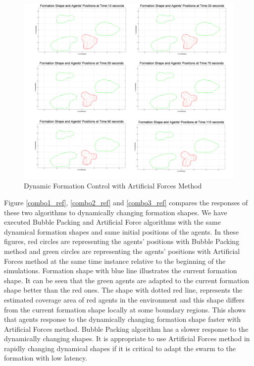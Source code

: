 \begin{figure}[H]
\caption{Dynamic Formation Control with Artificial Forces Method} \label{multiple2_ref}
\centerline{\includegraphics[scale = 0.16]{multiple2}}
\end{figure} 

Figure \ref{combo1_ref}, \ref{combo2_ref} and \ref{combo3_ref} compares the responses of these two algorithms to dynamically changing formation shapes. We have executed Bubble Packing and Artificial Force algorithms with the same dynamical formation shapes and same initial positions of the agents. In these figures, red circles are representing the agents' positions with Bubble Packing method and green circles are representing the agents' positions with Artificial Forces method at the same time instance relative to the beginning of the simulations. Formation shape with blue line illustrates the current formation shape. It can be seen that the green agents are adapted to the current formation shape better than the red ones. The shape with dotted red line, represents the estimated coverage area of red agents in the environment and this shape differs from the current formation shape locally at some boundary regions. This shows that agents response to the dynamically changing formation shape faster with Artificial Forces method. Bubble Packing algorithm has a slower response to the dynamically changing shapes. It is appropriate to use Artificial Forces method in rapidly changing dynamical shapes if it is critical to adapt the swarm to the formation with low latency.		 

